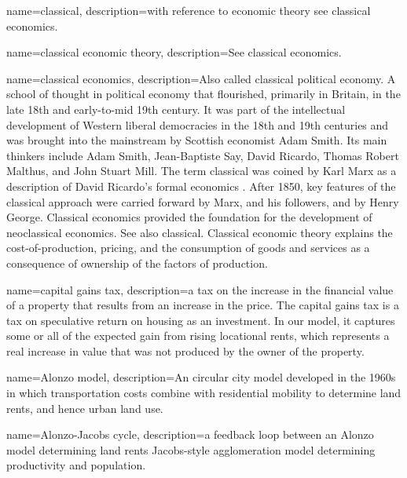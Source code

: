 {
name=classical,
description={with reference to economic theory see \gls{classical economics}.}
}

{
name=classical economic theory,
description={See \gls{classical economics}.}
}

{
name=classical economics,
description={Also called classical \gls{political economy}. %
A school of thought in political economy that flourished, primarily in Britain, in the late 18th and early-to-mid 19th century. It was part of the intellectual development of  Western liberal democracies in the 18th and 19th centuries and was brought into the mainstream by Scottish economist Adam Smith. Its main thinkers include Adam Smith, Jean-Baptiste Say, David Ricardo, Thomas Robert Malthus, and John Stuart Mill.  The term classical was coined by Karl Marx %
as a description of David Ricardo's formal economics \cite{colanderDeathNeoclassicalEconomics2000}. After 1850, key features of the classical approach were carried forward by Marx, and his followers, and by Henry George. Classical economics provided the foundation for the development of \gls{neoclassical economics}. See also \gls{classical}.  Classical economic theory explains the cost-of-production, pricing, and the consumption of goods and services as a consequence of ownership of the factors of production. }
}


{
name=capital gains tax,
description={a tax on the increase in the financial value of a property that results from an increase in the price. The capital gains tax is a tax on speculative return on housing as an investment. In our model, it captures some or all of the expected gain from rising \glspl{locational rent}, which represents a real increase in value that was not produced by the owner of the property.}
}

{
name=Alonzo model,
description={An circular city model developed in the 1960s in which transportation costs combine with residential mobility to determine land rents, and hence urban land use.}
}

{
name=Alonzo-Jacobs cycle,
description={a feedback loop between an \Gls{Alonzo model} determining land rents Jacobs-style \gls{agglomeration} model determining productivity and population.}
}

